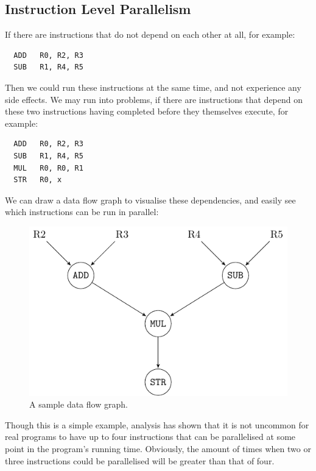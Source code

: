 \subsection{Instruction Level Parallelism}

If there are instructions that do not depend on each other at all, for example:

\begin{verbatim}
  ADD   R0, R2, R3
  SUB   R1, R4, R5
\end{verbatim}

Then we could run these instructions at the same time, and not experience any
side effects. We may run into problems, if there are instructions that depend on
these two instructions having completed before they themselves execute, for
example:

\begin{verbatim}
  ADD   R0, R2, R3
  SUB   R1, R4, R5
  MUL   R0, R0, R1
  STR   R0, x
\end{verbatim}

We can draw a data flow graph to visualise these dependencies, and easily see
which instructions can be run in parallel:

\begin{figure}[ht]
  \centering
  \includegraphics{diagrams/data-flow.pdf}
  \caption{A sample data flow graph.}
  \label{data-flow}
\end{figure}

Though this is a simple example, analysis has shown that it is not uncommon for
real programs to have up to four instructions that can be parallelised at some
point in the program's running time. Obviously, the amount of times when two or
three instructions could be parallelised will be greater than that of four.

